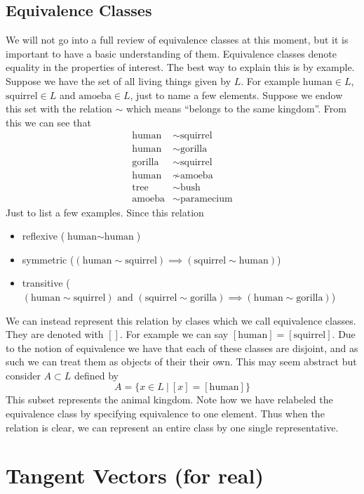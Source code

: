 \documentclass[a4paper]{article}
\begin{document}
\subsection*{Equivalence Classes}%
We will not go into a full review of equivalence classes at this moment, but it is important to have a basic understanding of them. Equivalence classes denote equality in the properties of interest. The best way to explain this is by example. Suppose we have the set of all living things given by $L$. For example $\text{human} \in L$, $\text{squirrel} \in L$ and $\text{amoeba} \in L$, just to name a few elements. Suppose we endow this set with the relation $\sim$ which means ``belongs to the same kingdom''. From this we can see that
\[
  \begin{aligned}
    \text{human} &\sim \text{squirrel} \\
    \text{human} &\sim \text{gorilla} \\
    \text{gorilla} &\sim \text{squirrel} \\
    \text{human} &\not\sim \text{amoeba} \\
    \text{tree} &\sim \text{bush} \\
    \text{amoeba} &\sim \text{paramecium}
  \end{aligned}
\]
Just to list a few examples. Since this relation 
\begin{itemize}
  \item reflexive ($\text{human} \sim \text{human}$)
  \item symmetric ($(\text{human} \sim \text{squirrel}) \implies (\text{squirrel} \sim \text{human})$) 
  \item transitive ($(\text{human} \sim \text{squirrel}) \text{ and } (\text{squirrel} \sim \text{gorilla}) \implies (\text{human} \sim \text{gorilla})$)
\end{itemize}
We can instead represent this relation by clases which we call equivalence classes. They are denoted with $ []$. For example we can say $[\text{human}] = [\text{squirrel}]$. Due to the notion of equivalence we have that each of these classes are disjoint, and as such we can treat them as objects of their their own. This may seem abstract but consider $A \subset L$ defined by
\[
  A = \{x \in L\ |\ [x] = [\text{human}]\}
\]
This subset represents the animal kingdom. Note how we have relabeled the equivalence class by specifying equivalence to one element. Thus when the relation is clear, we can represent an entire class by one single representative. 

\section*{Tangent Vectors (for real)}%
\end{document}
